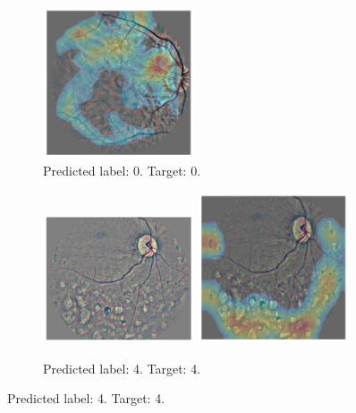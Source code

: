 \begin{figure}[tb]
\begin{subfigure}[b]{0.49\textwidth}
         \includegraphics[width=0.49\textwidth,height=0.49\textwidth]{figures/chapter6/heatmaps/5_right_heatmap.png}
         \caption{Predicted label: 0. Target: 0.}
     \end{subfigure}

    \bigskip
    \begin{subfigure}[b]{0.49\textwidth}
         \centering
         \includegraphics[width=0.49\textwidth,height=0.49\textwidth]{figures/chapter6/heatmaps/43670_left.png}
         \includegraphics[width=0.49\textwidth,height=0.49\textwidth]{figures/chapter6/heatmaps/43670_left_heatmap.png}
        \caption{Predicted label: 4. Target: 4.}


\end{subfigure}
\end{figure}

